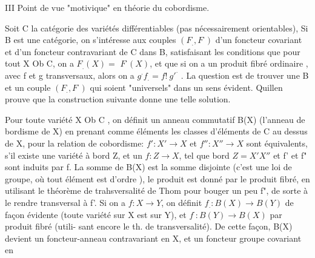 III   Point de vue "motivique" en théorie du cobordisme.

Soit C la catégorie des variétés différentiables (pas nécessairement
orientables),  Si B est une catégorie, on s'intéresse aux couples
$(F_{.},F^{\cdot})$ d'un foncteur covariant et d'un foncteur contravariant de C
dans B, satisfaisant les conditions que pour tout X \hand{$\in$} Ob C, on a $F_{.}(X)=$
$F^{\cdot}(X)$, et que si on a un produit fibré ordinaire
,
avec f et g transversaux, alors on a $g^{\cdot}f_{.} = f!\ g'^{\cdot}$ . La question est
de trouver une B et un couple $(F_{.},F^{\cdot})$ qui soient "universels" dans un
sens évident. Quillen prouve que la construction suivante donne une
telle solution.

Pour toute variété X\hand{$\in$} Ob C , on définit un anneau commutatif
B(X) (l'anneau de bordisme de X) en prenant comme éléments les classes
 d'éléments de C au dessus de X, pour la relation de cobordisme:
$f':X'\to X$ et $f'':X''\to X$ sont équivalents, s'il existe une variété à bord
Z, et un $f:Z\to X$, tel que bord $Z = X'$\hand{$\amalg$}$X''$ et f' et f" sont induits
par f. La somme de B(X) est la somme disjointe (c'est une loi de groupe,
 où tout élément est d'ordre  ), le produit est
donné par le produit fibré, en utilisant le théorème de trahsversalité
de Thom pour bouger un peu f", de sorte à le rendre transversal à f'.
Si on a $f: X\to Y$, on définit $f_{.} : B(X)\to B(Y)$ de façon évidente (toute
variété sur X est sur Y), et $f^{\cdot}: B(Y)\to B(X)$ par produit fibré (utili-%
sant encore le th. de transversalité). De cette façon, B(X) devient un
foncteur-anneau  contravariant en X, et un foncteur groupe covariant en


